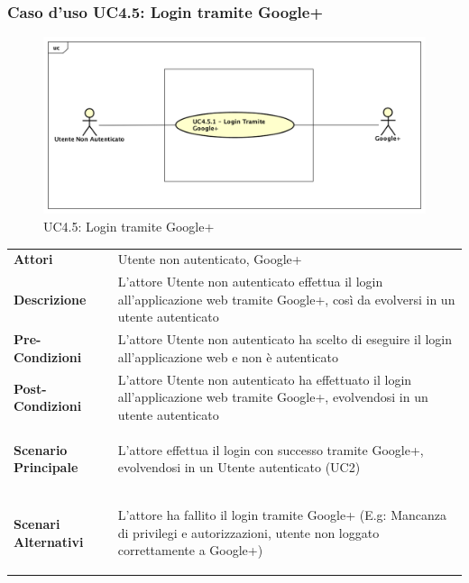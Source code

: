 \newpage
\subsubsection{Caso d'uso UC4.5: Login tramite Google+ }
\label{UC4_2}
\begin{figure}[!htbp]
	\centering
	\includegraphics[scale=0.45]{UML/UC4_5.png}
	\caption{UC4.5: Login tramite Google+}
\end{figure}

\begin{tabular}{ l | p{11cm}}
	\hline
	\rowcolor{Gray}
	\multicolumn{2}{c}{UC4.5 - Login tramite Google+} \\
	\hline
	\textbf{Attori} & Utente non autenticato, Google+ \\
	\textbf{Descrizione} & L'attore Utente non autenticato effettua il login all'applicazione web tramite Google+, così da evolversi in un utente autenticato\\
	\textbf{Pre-Condizioni} & L'attore Utente non autenticato ha scelto di eseguire il login all'applicazione web e non è autenticato \\
	\textbf{Post-Condizioni} & L'attore Utente non autenticato ha effettuato il login all'applicazione web tramite Google+, evolvendosi in un utente autenticato \\
	\textbf{Scenario Principale} & \begin{enumerate*}[label=(\arabic*.),itemjoin={\newline}]
		\item L'attore effettua il login con successo tramite Google+, evolvendosi in un Utente autenticato (UC2)
	\end{enumerate*}\\
	\textbf{Scenari Alternativi} & \begin{enumerate*}[label=(\arabic*.),itemjoin={\newline}]
		\item L'attore ha fallito il login tramite Google+ (E.g: Mancanza di privilegi e autorizzazioni, utente non loggato correttamente a Google+)
	\end{enumerate*}\\
\end{tabular}